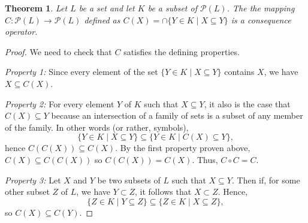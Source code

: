 \documentclass[12pt]{article}
\newtheorem{theorem}{Theorem}
\begin{document}
\begin{theorem}
Let $L$ be a set and let $K$ be a subset of $\mathcal{P}(L)$.  The the mapping
$C \colon \mathcal{P}(L) \to \mathcal{P}(L)$ defined as $ C(X) = \cap \{ Y \in K
\mid X \subseteq Y\}$ is a consequence operator.
\end{theorem}

\begin{proof}
We need to check that $C$ satisfies the defining properties.

\emph{ Property 1:} 
Since every element of the set $\{ Y \in K \mid X \subseteq Y \}$ 
contains $X$, we have $X \subseteq C(X)$.

\emph{ Property 2:}
For every element $Y$ of $K$ such that $X \subseteq Y$, it also is the case that
$C(X) \subseteq Y$ because an intersection of a family of sets is a subset of
any member of the family.  In other words (or rather, symbols),
 \[ \{ Y \in K \mid X \subseteq Y \} \subseteq \{ Y \in K \mid C(X) 
\subseteq Y \},\]
hence $C(C(X)) \subseteq C(X)$.  By the first property proven above, $C(X)
\subseteq C(C(X))$ so $C(C(X)) = C(X)$.  Thus, $C \circ C = C$.

\emph{Property 3:}
Let $X$ and $Y$ be two subsets of $L$ such that $X \subseteq Y$.  Then if,
for some other subset $Z$ of $L$, we have $Y \subset Z$, it follows that
$X \subset Z$.  Hence,
 \[ \{ Z \in K \mid Y \subseteq Z \} \subseteq \{ Z \in K \mid X 
\subseteq Z \},\]
so $C(X) \subseteq C(Y)$.

\end{proof}
\end{document}
